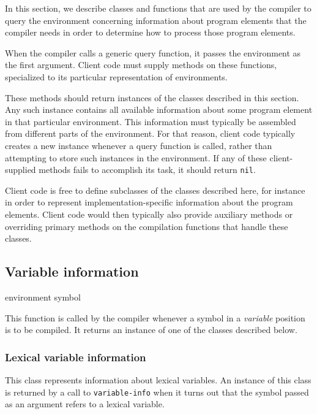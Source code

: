In this section, we describe classes and functions that are used by
the compiler to query the environment concerning information about
program elements that the compiler needs in order to determine how to
process those program elements. 

When the compiler calls a generic query function, it passes the
environment as the first argument.  Client code must supply methods
on these functions, specialized to its particular representation of
environments. 

These methods should return instances of the classes described in this
section.  Any such instance contains all available information about
some program element in that particular environment.  This information
must typically be assembled from different parts of the environment.
For that reason, client code typically creates a new instance whenever
a query function is called, rather than attempting to store such
instances in the environment.  If any of these client-supplied methods
fails to accomplish its task, it should return \texttt{nil}.

Client code is free to define subclasses of the classes described
here, for instance in order to represent implementation-specific
information about the program elements.  Client code would then
typically also provide auxiliary methods or overriding primary methods
on the compilation functions that handle these classes.

\subsection{Variable information}

 {environment symbol}

This function is called by the compiler whenever a symbol in a
\emph{variable} position is to be compiled.  It returns an instance of
one of the classes described below.

\subsubsection{Lexical variable information}


This class represents information about lexical variables.  An
instance of this class is returned by a call to \texttt{variable-info}
when it turns out that the symbol passed as an argument refers to a
lexical variable.

